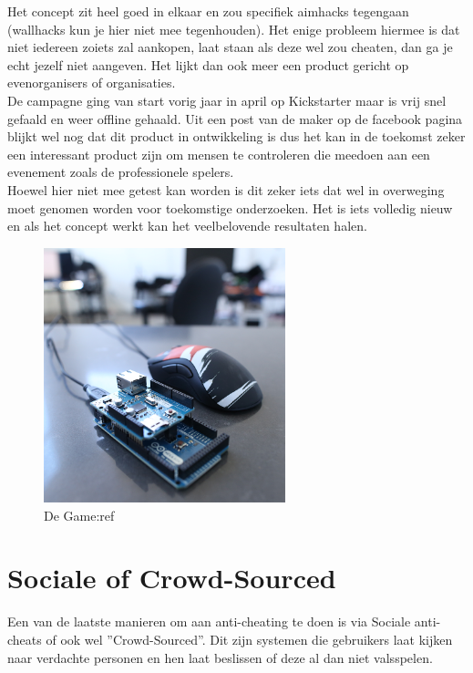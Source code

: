 \documentclass[pdftex,a4paper,12pt,twoside]{report}
\begin{document}
Het concept zit heel goed in elkaar en zou specifiek aimhacks tegengaan (wallhacks kun je hier niet mee tegenhouden). Het enige probleem hiermee is dat niet iedereen zoiets zal aankopen, laat staan als deze wel zou cheaten, dan ga je echt jezelf niet aangeven. Het lijkt dan ook meer een product gericht op evenorganisers of organisaties. 
\\

De campagne ging van start vorig jaar in april op Kickstarter maar is vrij snel gefaald en weer offline gehaald. Uit een post van de maker op de facebook pagina blijkt wel nog dat dit product in ontwikkeling is dus het kan in de toekomst zeker een interessant product zijn om mensen te controleren die meedoen aan een evenement zoals de professionele spelers.
\citep{gameref} 
\\

Hoewel hier niet mee getest kan worden is dit zeker iets dat wel in overweging moet genomen worden voor toekomstige onderzoeken. Het is iets volledig nieuw en als het concept werkt kan het veelbelovende resultaten halen.

\begin{figure}
\centering
\includegraphics[width=7cm]{img/game-ref1}
\caption{De Game:ref}
\end{figure}



\section{Sociale of Crowd-Sourced}
\label{sec:sociale}
Een van de laatste manieren om aan anti-cheating te doen is via Sociale anti-cheats of ook wel ''Crowd-Sourced''. Dit zijn systemen die gebruikers laat kijken naar verdachte personen en hen laat beslissen of deze al dan niet valsspelen. 
\\
\end{document}
